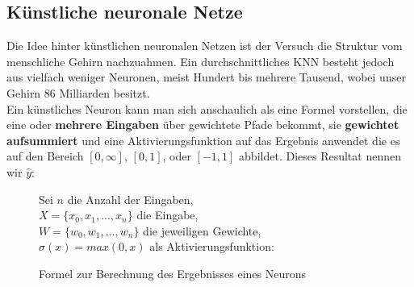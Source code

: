         \subsection{Künstliche neuronale Netze}

            Die Idee hinter künstlichen neuronalen Netzen ist der Versuch die Struktur vom menschliche Gehirn nachzuahmen. Ein durchschnittliches KNN besteht jedoch aus vielfach weniger Neuronen, meist Hundert bis mehrere Tausend, wobei unser Gehirn 86 Milliarden\cite{brainsize} besitzt.\\

            \noindent
            Ein künstliches Neuron kann man sich anschaulich als eine Formel vorstellen, die eine oder \textbf{mehrere Eingaben} über gewichtete Pfade bekommt, sie \textbf{gewichtet aufsummiert} und eine Aktivierungsfunktion auf das Ergebnis anwendet die es auf den Bereich $[0,\infty]$, $[0,1]$, oder $[-1,1]$ abbildet. Dieses Resultat nennen wir $\hat{y}$:

            \begin{figure}[H]
                \begin{mdframed}
                    \noindent
                    Sei $n$ die Anzahl der Eingaben,\\
                    \hspace*{4.5mm}    $X = \{x_0,x_1,...,x_n\}$ die Eingabe,\\
                    \hspace*{4.5mm}    $W = \{w_0, w_1,...,w_n\}$ die jeweiligen Gewichte, \\
                    \hspace*{4.5mm}    $\sigma(x) = max(0,x)$ als Aktivierungsfunktion:\\[4mm]
                    \hspace*{50mm} 
                \end{mdframed}
                \caption{\label{neuron-math} Formel zur Berechnung des Ergebnisses eines Neurons}
            \end{figure}

